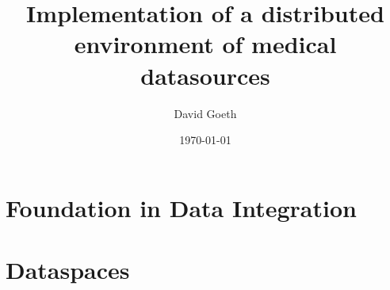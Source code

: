\documentclass[a4paper,12pt,titlepage, openany, openright, cleardoubleempty]{scrreprt} %
\title{Implementation of a distributed environment of medical datasources}
\author{David Goeth}
\date{\today}
\begin{document}
\graphicspath{{pics/}}

\pagestyle{empty}




\pagestyle{fancy}





\tableofcontents


\listoftables
{}

\listoffigures
{}

\cleardoublepage
{}

%


\chapter{Foundation in Data Integration}

\chapter{Dataspaces} \label{chapter_dataspaces}

%
%
%
%
%

\end{document}
